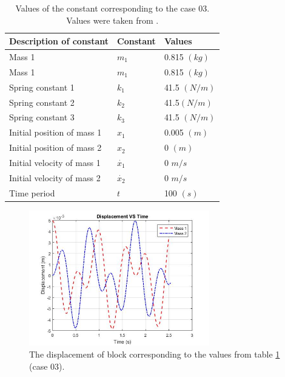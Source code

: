  \begin{table}[hbt!]
\begin{center}
    \begin{tabular}{p{6cm}|p{2cm}|p{3cm}}
    \hline
    \textbf{Description of constant} & \textbf{Constant} & \textbf{Values}
    \\
    \hline \hline
    Mass 1 & $m_1$ & 0.815 $(kg)$\\
    Mass 1 & $m_1$ & 0.815 $(kg)$\\
    Spring constant 1  & $k_1$ & 41.5 $(N/m)$\\
    Spring constant 2  & $k_2$ & 41.5$(N/m)$\\
    Spring constant 3  & $k_3$ & 41.5 $(N/m)$\\
     Initial position of mass 1 & $x_1$ & 0.005 $(m)$ \\
     Initial position of mass 2 & $x_2$ & 0 $(m)$  \\
     Initial velocity of mass 1 & $\dot{x_1}$ & 0 $m/s$ \\
     Initial velocity of mass 2 & $\dot{x_2}$ & 0 $m/s$  \\
     Time period & $t$ & 100 $(s)$ \\
     \hline
    \end{tabular}
    \caption{Values of the constant corresponding to the case 03. Values were taken from \cite{JETIRRes28:online}. }
    \label{tabR1}
    \end{center}
\end{table}
  
  \begin{figure}[hbt!]
	\centering
	\begin{framed}
	\includegraphics[width=0.7\textwidth]{Figures/R3D.jpg}
		\end{framed}
	\caption{ The displacement of block corresponding to the values from table \ref{tabR1} (case 03). }
	\label{fig:R5}
\end{figure}

